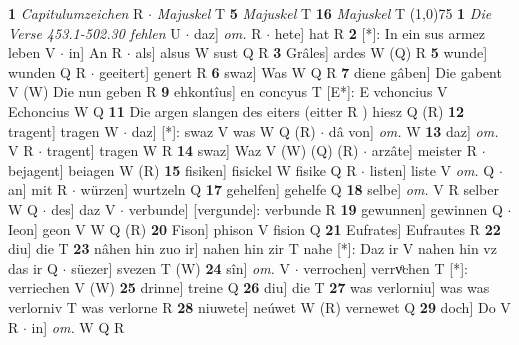 \documentclass[8pt,a4paper,notitlepage]{article}
\begin{document}
\begin{table}[ht]
\begin{minipage}[t]{0.5\linewidth}
\textbf{1} \textit{Capitulumzeichen} R   $\cdot$ \textit{Majuskel} T  \textbf{5} \textit{Majuskel} T  \textbf{16} \textit{Majuskel} T  \newline
\line(1,0){75} \newline
\textbf{1} \textit{Die Verse 453.1-502.30 fehlen} U   $\cdot$ daz] \textit{om.} R  $\cdot$ hete] hat R \textbf{2} [*]: In ein sus armez leben V  $\cdot$ in] An R  $\cdot$ als] alsus W sust Q R \textbf{3} Grâles] ardes W (Q) R \textbf{5} wunde] wunden Q R  $\cdot$ geeitert] genert R \textbf{6} swaz] Was W Q R \textbf{7} diene gâben] Die gabent V (W) Die nun geben R \textbf{9} ehkontîus] en concyus T [E*]: E vchoncius V Echoncius W Q \textbf{11} Die argen slangen des eiters (eitter R ) hiesz Q (R) \textbf{12} tragent] tragen W  $\cdot$ daz] [*]: swaz V was W Q (R)  $\cdot$ dâ von] \textit{om.} W \textbf{13} daz] \textit{om.} V R  $\cdot$ tragent] tragen W R \textbf{14} swaz] Waz V (W) (Q) (R)  $\cdot$ arzâte] meister R  $\cdot$ bejagent] beiagen W (R) \textbf{15} fisiken] fisickel W fisike Q R  $\cdot$ listen] liste V \textit{om.} Q  $\cdot$ an] mit R  $\cdot$ würzen] wurtzeln Q \textbf{17} gehelfen] gehelfe Q \textbf{18} selbe] \textit{om.} V R selber W Q  $\cdot$ des] daz V  $\cdot$ verbunde] [vergunde]: verbunde R \textbf{19} gewunnen] gewinnen Q  $\cdot$ Ieon] geon V W Q (R) \textbf{20} Fison] phison V fision Q \textbf{21} Eufrates] Eufrautes R \textbf{22} diu] die T \textbf{23} nâhen hin zuo ir] nahen hin zir T nahe [*]: Daz ir V nahen hin vz das ir Q  $\cdot$ süezer] svezen T (W) \textbf{24} sîn] \textit{om.} V  $\cdot$ verrochen] verrvͦchen T [*]: verriechen V (W) \textbf{25} drinne] treine Q \textbf{26} diu] die T \textbf{27} was verlorniu] was was verlorniv T was verlorne R \textbf{28} niuwete] neúwet W (R) vernewet Q \textbf{29} doch] Do V R  $\cdot$ in] \textit{om.} W Q R \newline
\end{minipage}
\end{table}
\end{document}
